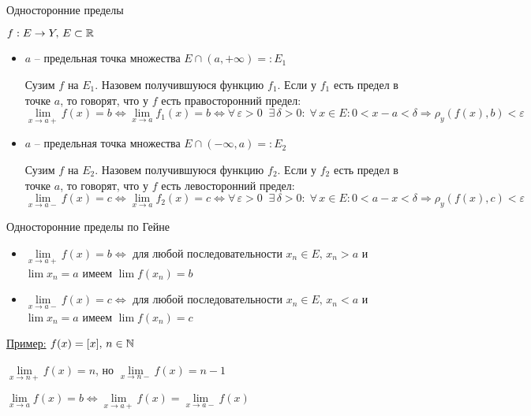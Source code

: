 \vspace{7mm}

\begin{conj}
    Односторонние пределы
\end{conj}
$f : E \to Y, \, E \subset \mathbb{R}$
\begin{itemize}
    \item $a$ -- предельная точка множества $E \cap (a, +\infty) =: E_1$
    
    Сузим $f$ на $E_1$. Назовем получившуюся функцию $f_1$. 
    Если у $f_1$ есть предел в точке $a$, то говорят, что у $f$ есть правосторонний предел:
    \[ \lim_{x \to a+} f(x) = b \Longleftrightarrow \lim_{x \to a} f_1(x) = b \Longleftrightarrow 
    \forall \, \varepsilon > 0 \;\; \exists \, \delta > 0 : \; \forall \, x \in E : 0 < x - a < \delta \Rightarrow\rho_y(f(x), b) < \varepsilon \]
    
    \item $a$ -- предельная точка множества $E \cap (-\infty, a) =: E_2$
    
    Сузим $f$ на $E_2$. Назовем получившуюся функцию $f_2$.
    Если у $f_2$ есть предел в точке $a$, то говорят, что у $f$ есть левосторонний предел:
    \[ \lim_{x \to a-} f(x) = c \Longleftrightarrow \lim_{x \to a} f_2(x) = c \Longleftrightarrow 
    \forall \, \varepsilon > 0 \;\; \exists \, \delta > 0 : \; \forall \, x \in E : 0 < a - x < \delta \Rightarrow\rho_y(f(x), c) < \varepsilon \]
\end{itemize}
\begin{conj}
    Односторонние пределы по Гейне
\end{conj}
\begin{itemize}
    \item $\lim\limits_{x \to a+} f(x) = b \Longleftrightarrow$ для любой последовательности $x_n \in E, \, x_n > a$ и $\lim x_n = a$ имеем $\lim f(x_n) = b$
    \item $\lim\limits_{x \to a-} f(x) = c \Longleftrightarrow$ для любой последовательности $x_n \in E, \, x_n < a$ и $\lim x_n = a$ имеем $\lim f(x_n) = c$
\end{itemize}
\underline{Пример:} $f(x) = [x], \, n \in \mathbb{N}$

$\lim\limits_{x \to n+} f(x) = n$, но $\lim\limits_{x \to n-} f(x) = n - 1$

\begin{notice}
    $\lim\limits_{x \to a} f(x) = b \Longleftrightarrow \lim\limits_{x \to a+} f(x) = \lim\limits_{x \to a-} f(x)$
\end{notice}

